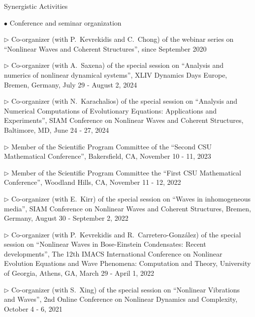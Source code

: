 \documentclass[10pt]{article} %
\newenvironment{outerlist}[1][\enskip\textbullet]%
        {\begin{itemize}[#1]}{\end{itemize}%
         \vspace{-.6\baselineskip}}
\newenvironment{innerlist}[1][\enskip\textbullet]%
        {\begin{compactitem}[#1]}{\end{compactitem}}
\begin{document}
\begin{section}{Synergistic Activities}
\begin{outerlist}
\item[$\bullet$]  \vskip -7mm Conference and seminar organization 
\begin{innerlist} 
\item[$\triangleright$] Co-organizer (with P.~Kevrekidis and C.~Chong) of the webinar series on
                        ``Nonlinear Waves and Coherent Structures'', since September 2020
\item[$\triangleright$] Co-organizer (with A.~Saxena) of the special session on ``Analysis and numerics of nonlinear dynamical systems'',
XLIV Dynamics Days Europe, Bremen, Germany, July 29 - August 2, 2024
\item[$\triangleright$] Co-organizer (with N.~Karachalios) of the special session on ``Analysis and
Numerical Computations of Evolutionary Equations: Applications and Experiments'',
                        SIAM Conference on Nonlinear Waves and Coherent Structures, Baltimore, MD, June 24 - 27, 2024
\item[$\triangleright$] Member of the Scientific Program Committee of the ``Second CSU Mathematical Conference'', Bakersfield, CA, November 10 - 11, 2023
\item[$\triangleright$] Member of the Scientific Program Committee the ``First CSU Mathematical Conference'', Woodland Hills, CA, November 11 - 12, 2022
\item[$\triangleright$] Co-organizer (with E.~Kirr) of the special session on ``Waves in inhomogeneous media'',
                        SIAM Conference on Nonlinear Waves and Coherent Structures, Bremen, Germany, August 30 - September 2, 2022                        
\item[$\triangleright$] Co-organizer (with P.~Kevrekidis and R.~Carretero-Gonz{\'a}lez) of 
                        the special session on ``Nonlinear Waves in Bose-Einstein Condensates: Recent developments'', 
                        The 12th IMACS International Conference on Nonlinear Evolution Equations and Wave Phenomena: 
                        Computation and Theory, University of Georgia, Athens, GA, March 29 - April 1, 2022                       
\item[$\triangleright$] Co-organizer (with S.~Xing) of the special session on ``Nonlinear Vibrations and Waves'', %
                        2nd Online Conference on Nonlinear Dynamics and Complexity, October 4 - 6, 2021

\end{innerlist}
\end{outerlist}
\end{section}
\end{document}

